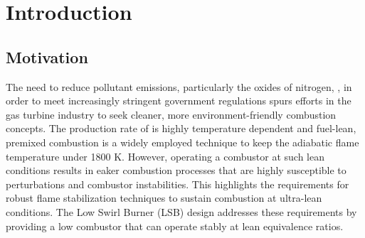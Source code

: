 \chapter{Introduction}
\label{chapter:introduction}

\section{Motivation}

The need to reduce pollutant emissions, particularly the oxides of nitrogen, , in order to meet increasingly stringent government regulations spurs efforts in the gas turbine industry to seek cleaner, more environment-friendly combustion concepts.
The production rate of  is highly temperature dependent and fuel-lean, premixed combustion is a widely employed technique to keep the adiabatic flame temperature under 1800 K.
However, operating a combustor at such lean conditions results in eaker combustion processes that are highly susceptible to perturbations and combustor instabilities.
This highlights the requirements for robust flame stabilization techniques to sustain combustion at ultra-lean conditions.
The Low Swirl Burner (LSB) design addresses these requirements by providing a low  combustor that can operate stably at lean equivalence ratios.



